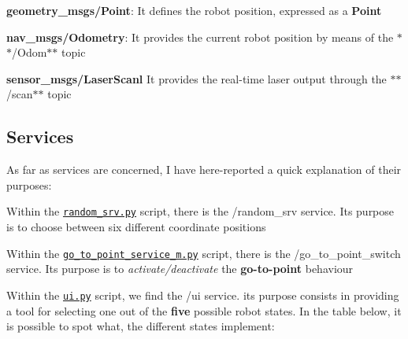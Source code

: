 \begin{DoxyItemize}
\item {\bfseries geometry\+\_\+msgs/\+Point}\+: It defines the robot position, expressed as a {\bfseries Point}
\item {\bfseries nav\+\_\+msgs/\+Odometry}\+: It provides the current robot position by means of the $\ast$$\ast$/\+Odom$\ast$$\ast$ topic
\item {\bfseries sensor\+\_\+msgs/\+Laser\+Scanl} It provides the real-\/time laser output through the $\ast$$\ast$/scan$\ast$$\ast$ topic
\end{DoxyItemize}

\subsection*{Services}

As far as services are concerned, I have here-\/reported a quick explanation of their purposes\+:


\begin{DoxyEnumerate}
\item Within the \href{https://github.com/fedehub/final_assignment/tree/main/scripts/random_srv.py}{\tt random\+\_\+srv.\+py} script, there is the {\ttfamily /random\+\_\+srv} service. Its purpose is to choose between six different coordinate positions
\item Within the \href{https://github.com/fedehub/final_assignment/tree/main/scripts/go_to_point_service_m.py}{\tt go\+\_\+to\+\_\+point\+\_\+service\+\_\+m.\+py} script, there is the {\ttfamily /go\+\_\+to\+\_\+point\+\_\+switch} service. Its purpose is to {\itshape activate/deactivate} the {\bfseries go-\/to-\/point} behaviour
\item Within the \href{https://github.com/fedehub/final_assignment/tree/main/scripts/ui.py}{\tt ui.\+py} script, we find the {\ttfamily /ui} service. its purpose consists in providing a tool for selecting one out of the {\bfseries five} possible robot states. In the table below, it is possible to spot what, the different states implement\+:
\end{DoxyEnumerate}

